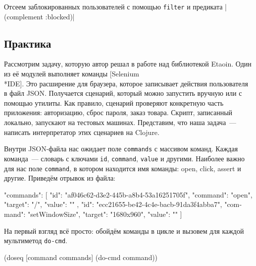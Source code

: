 \fi


Отсеем заблокированных пользователей с помощью \verb|filter| и предиката
\spverb|(complement :blocked)|

\subsection{Практика}


\label{selenium-ide}

Рассмотрим задачу, которую автор решал в работе над библиотекой Etaoin. Один из
её модулей выполняет команды [Selenium\\*IDE].
Это расширение для браузера, которое записывает действия пользователя в файл
JSON. Получается сценарий, который можно запустить вручную или с помощью
утилиты. Как правило, сценарий проверяют конкретную часть приложения:
авторизацию, сброс пароля, заказ товара. Скрипт, записанный локально, запускают
на тестовых машинах. Представим, что наша задача~--- написать интерпретатор этих сценариев на Clojure.

Внутри JSON-файла нас ожидает поле \verb|commands| с массивом команд. Каждая
команда~--- словарь с ключами \verb|id|, \verb|command|, \verb|value| и
другими. Наиболее важно для нас поле \verb|command|, в котором находится имя
команды: open, click, assert и другие. Приведём отрывок из файла:

\begin{english}
  \begin{json}
"commands": [{
  "id": "af046c62-d3e2-445b-a8b4-53a16251705f",
  "command": "open",
  "target": "/",
  "value": ""
}, {
  "id": "ecc21655-be42-4c4e-bacb-91da3f4abba7",
  "command": "setWindowSize",
  "target": "1680x960",
  "value": ""
}]
  \end{json}
\end{english}


На первый взгляд всё просто: обойдём команды в цикле и вызовем для каждой
мультиметод \verb|do-cmd|.

\begin{english}
  \begin{clojure}
(doseq [command commands]
  (do-cmd command))
  \end{clojure}
\end{english}


